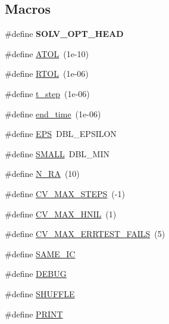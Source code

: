 \subsection*{Macros}
\begin{DoxyCompactItemize}
\item 
\#define {\bfseries S\+O\+L\+V\+\_\+\+O\+P\+T\+\_\+\+H\+E\+AD}\hypertarget{solver__options_8cuh_a0cdb20d794f10fb22eebe8854ae6aa45}{}\label{solver__options_8cuh_a0cdb20d794f10fb22eebe8854ae6aa45}

\item 
\#define \hyperlink{solver__options_8cuh_a29a15cd00b37b1f4a5b4ec9f07c742f4}{A\+T\+OL}~(1e-\/10)
\item 
\#define \hyperlink{solver__options_8cuh_af50ac611d9fae906f9419504fd2caa5d}{R\+T\+OL}~(1e-\/06)
\item 
\#define \hyperlink{solver__options_8cuh_aaeb7127cf3bf0b49cec6554fbc101866}{t\+\_\+step}~(1e-\/06)
\item 
\#define \hyperlink{solver__options_8cuh_a25526ead9bdb589c90e7a8d3b4d1a746}{end\+\_\+time}~(1e-\/06)
\item 
\#define \hyperlink{solver__options_8cuh_a6ebf6899d6c1c8b7b9d09be872c05aae}{E\+PS}~D\+B\+L\+\_\+\+E\+P\+S\+I\+L\+ON
\item 
\#define \hyperlink{solver__options_8cuh_a09c78d2f8feb311dd9fc969a0bf84979}{S\+M\+A\+LL}~D\+B\+L\+\_\+\+M\+IN
\item 
\#define \hyperlink{solver__options_8cuh_a69f5533c684b73d07a7e20146a285cb1}{N\+\_\+\+RA}~(10)
\item 
\#define \hyperlink{solver__options_8cuh_a8dd330cbca99d70609ccc451d9099383}{C\+V\+\_\+\+M\+A\+X\+\_\+\+S\+T\+E\+PS}~(-\/1)
\item 
\#define \hyperlink{solver__options_8cuh_af45d9c410d5d7c99d2692080832d506e}{C\+V\+\_\+\+M\+A\+X\+\_\+\+H\+N\+IL}~(1)
\item 
\#define \hyperlink{solver__options_8cuh_ac42e0287ba619ab25b7d767a81f48082}{C\+V\+\_\+\+M\+A\+X\+\_\+\+E\+R\+R\+T\+E\+S\+T\+\_\+\+F\+A\+I\+LS}~(5)
\item 
\#define \hyperlink{solver__options_8cuh_aa98acf0dc83a3dce3ba168d75a74cb1b}{S\+A\+M\+E\+\_\+\+IC}
\item 
\#define \hyperlink{solver__options_8cuh_ad72dbcf6d0153db1b8d8a58001feed83}{D\+E\+B\+UG}
\item 
\#define \hyperlink{solver__options_8cuh_a0b43a0be2f674fea3218e7fb5221db1f}{S\+H\+U\+F\+F\+LE}
\item 
\#define \hyperlink{solver__options_8cuh_a8b43bafee90b30676faae508c21cb8d7}{P\+R\+I\+NT}

\end{DoxyCompactItemize}
